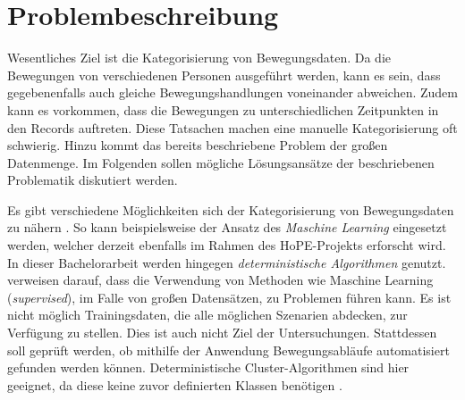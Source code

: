 \clearpage
\section{Problembeschreibung}
\label{2-Problembeschreibung}
Wesentliches Ziel ist die Kategorisierung von Bewegungsdaten.
Da die Bewegungen von verschiedenen Personen ausgeführt werden,
kann es sein, dass gegebenenfalls auch gleiche Bewegungshandlungen voneinander abweichen.
Zudem kann es vorkommen, dass die Bewegungen zu unterschiedlichen Zeitpunkten in den Records auftreten.
Diese Tatsachen machen eine manuelle Kategorisierung oft schwierig.
Hinzu kommt das bereits beschriebene Problem der großen Datenmenge.
Im Folgenden sollen mögliche Lösungsansätze der beschriebenen Problematik diskutiert werden.

Es gibt verschiedene Möglichkeiten sich der Kategorisierung von Bewegungsdaten zu nähern \citet{aghabozorgi_time-series_2015}.
So kann beispielsweise der Ansatz des \emph{Maschine Learning} eingesetzt werden,
welcher derzeit ebenfalls im Rahmen des HoPE-Projekts erforscht \citep{plischke_master_2022} wird.
In dieser Bachelorarbeit werden hingegen \emph{deterministische Algorithmen} genutzt.
\citet{aghabozorgi_time-series_2015} verweisen darauf, dass die Verwendung von Methoden
wie Maschine Learning (\emph{supervised}), im Falle von großen Datensätzen, zu Problemen führen kann.
Es ist nicht möglich Trainingsdaten, die alle möglichen Szenarien abdecken, zur Verfügung zu stellen.
Dies ist auch nicht Ziel der Untersuchungen.
Stattdessen soll geprüft werden,
ob mithilfe der Anwendung Bewegungsabläufe automatisiert gefunden werden können.
Deterministische Cluster-Algorithmen sind hier geeignet,
da diese keine zuvor definierten Klassen benötigen \citep{aghabozorgi_time-series_2015}.

